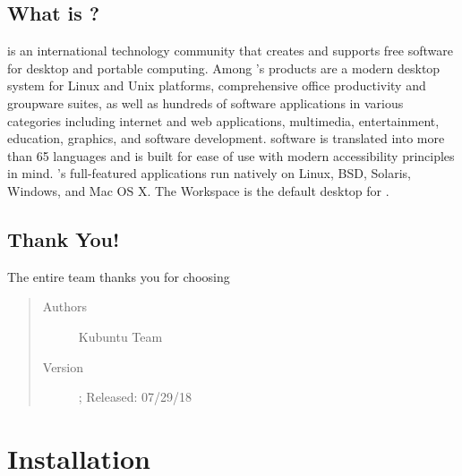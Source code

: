 \documentclass[letterpaper,10pt,english]{sphinxmanual}
\begin{document}
\section{What is ?}
\label{\detokenize{welcome:what-is-kde}}
 is an international technology community that creates and supports free software for desktop and portable computing. Among ’s products are a modern desktop system for Linux and Unix platforms, comprehensive office productivity and groupware suites, as well as hundreds of software applications in various categories including internet and web applications, multimedia, entertainment, education, graphics, and software development.  software is translated into more than 65 languages and is built for ease of use with modern accessibility principles in mind. ’s full-featured applications run natively on Linux, BSD, Solaris, Windows, and Mac OS X. The  Workspace is the default desktop for .


\section{Thank You!}
\label{\detokenize{welcome:thank-you}}
The entire  team thanks you for choosing 
\begin{quote}\begin{description}
\item[{Authors}] \leavevmode
Kubuntu Team

\item[{Version}]  ; Released: 07/29/18

\end{description}\end{quote}


\chapter{Installation}
\label{\detokenize{docs/installation:installation}}\label{\detokenize{docs/installation::doc}}
\end{document}
